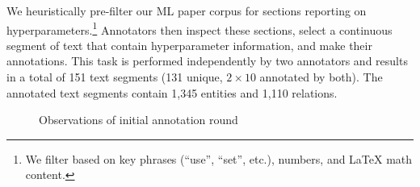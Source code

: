 We heuristically pre-filter our ML paper corpus for sections reporting on hyperparameters.\footnote{We filter based on key phrases (``use'', ``set'', etc.), numbers, and \LaTeX{} math content.} Annotators then inspect these sections, select a continuous segment of text that contain hyperparameter information, and make their annotations. This task is performed independently by two annotators and results in a total of 151 text segments (131 unique, $2\times10$ annotated by both). The annotated text segments contain 1,345 entities and 1,110 relations.

\begin{figure}
    \centering
    \caption{Observations of initial annotation round}
    \label{fig:init-annot}
\end{figure}





